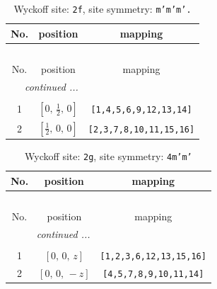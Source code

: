 \documentclass[fleqn,8pt]{jsarticle}
\begin{document}
\renewcommand{\arraystretch}{1.2}
\begin{longtable}{ccc}
\caption{Wyckoff site: {\tt 2f}, site symmetry: {\tt m'm'm'.}}
 \\
 \hline \hline
No. & position & mapping \\ \hline \endfirsthead

\multicolumn{2}{l}{\tablename\ \thetable{}} \\
 \hline \hline
No. & position & mapping \\ \hline \endhead

 \hline \hline
\multicolumn{2}{r}{\footnotesize\it continued ...} \\ \endfoot

 \hline \hline
\multicolumn{2}{r}{} \\ \endlastfoot

1 & $\left[ 0,\, \frac{1}{2},\, 0 \right]$ & {\tt [1,4,5,6,9,12,13,14]} \\ \hline
2 & $\left[ \frac{1}{2},\, 0,\, 0 \right]$ & {\tt [2,3,7,8,10,11,15,16]} \\
\end{longtable}
\renewcommand{\arraystretch}{1.2}
\begin{longtable}{ccc}
\caption{Wyckoff site: {\tt 2g}, site symmetry: {\tt 4m'm'}}
 \\
 \hline \hline
No. & position & mapping \\ \hline \endfirsthead

\multicolumn{2}{l}{\tablename\ \thetable{}} \\
 \hline \hline
No. & position & mapping \\ \hline \endhead

 \hline \hline
\multicolumn{2}{r}{\footnotesize\it continued ...} \\ \endfoot

 \hline \hline
\multicolumn{2}{r}{} \\ \endlastfoot

1 & $\left[ 0,\, 0,\, z \right]$ & {\tt [1,2,3,6,12,13,15,16]} \\ \hline
2 & $\left[ 0,\, 0,\, - z \right]$ & {\tt [4,5,7,8,9,10,11,14]} \\
\end{longtable}
\renewcommand{\arraystretch}{1.2}
\end{document}
